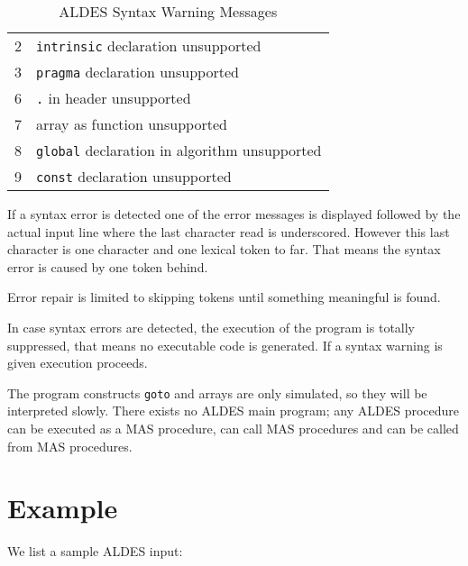 \begin{table}
\begin{center}
\begin{tabular}{rl}
           2  & \verb/intrinsic/ declaration unsupported \\
           3  & \verb/pragma/ declaration unsupported \\
           6  & \verb/./ in header unsupported \\
           7  & array as function unsupported \\
           8  & \verb/global/ declaration in algorithm unsupported \\
           9  & \verb/const/ declaration unsupported 
\end{tabular}
\caption{ALDES Syntax Warning Messages}
\label{tabASW}
\end{center}
\end{table}

If a syntax error is detected one of the error messages is
displayed followed by the actual input line where the last
character read is underscored. However this last character
is one character and one lexical token to far. That means 
the syntax error is caused by one token behind.

Error repair is limited to skipping tokens until 
something meaningful is found.

In case syntax errors are detected, the execution of the program 
is totally suppressed, that means no executable code is generated.
If a syntax warning is given execution proceeds.

The program constructs \verb/goto/ and arrays are only simulated, so 
they will be interpreted slowly.
There exists no ALDES main program; any ALDES procedure
can be executed as a MAS procedure, 
can call MAS procedures and can be called from MAS procedures.

\section{Example}

We list a sample ALDES input:

